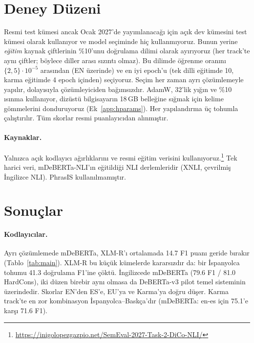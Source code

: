 \section{Deney Düzeni}
\label{sec:setup}

Resmi test kümesi ancak Ocak 2027'de yayımlanacağı için açık dev kümesini test kümesi olarak kullanıyor ve model seçiminde hiç kullanmıyoruz. Bunun yerine \emph{eğitim} kaynak çiftlerinin \%10'unu doğrulama dilimi olarak ayırıyoruz (her track'te aynı çiftler; böylece diller arası sızıntı olmaz). Bu dilimde öğrenme oranını $\{2,5\}\cdot10^{-5}$ arasından (EN üzerinde) ve en iyi epoch'u (tek dilli eğitimde 10, karma eğitimde 4 epoch içinden) seçiyoruz. Seçim her zaman ayrı çözümlemeyle yapılır, dolayısıyla çözümleyiciden bağımsızdır. AdamW, 32'lik yığın ve \%10 ısınma kullanıyor, dizüstü bilgisayarın 18\,GB belleğine sığmak için kelime gömmelerini donduruyoruz (Ek~\ref{app:hparams}). Her yapılandırma üç tohumla çalıştırılır. Tüm skorlar resmi puanlayıcıdan alınmıştır.

\paragraph{Kaynaklar.} Yalnızca açık kodlayıcı ağırlıklarını ve resmi eğitim verisini kullanıyoruz.\footnote{\url{https://inigolopezgazpio.net/SemEval-2027-Task-2-DiCo-NLI/}} Tek harici veri, mDeBERTa-NLI'ın eğitildiği NLI derlemleridir (XNLI, çevrilmiş İngilizce NLI). PhrasIS kullanılmamıştır.

\section{Sonuçlar}
\label{sec:results}



\paragraph{Kodlayıcılar.} Ayrı çözümlemede mDeBERTa, XLM-R'ı ortalamada 14.7 F1 puanı geride bırakır (Tablo~\ref{tab:main}). XLM-R bu küçük kümelerde kararsızdır da: bir İspanyolca tohumu 41.3 doğrulama F1'ine çöktü. İngilizcede mDeBERTa (79.6 F1 / 81.0 HardCons), iki düzen birebir aynı olmasa da DeBERTa-v3 pilot temel sisteminin \citep[75 / 79;][]{apaolaza2026assessing} üzerindedir. Skorlar EN'den ES'e, EU'ya ve Karma'ya doğru düşer. Karma track'te en zor kombinasyon İspanyolca--Baskça'dır (mDeBERTa: en-es için 75.1'e karşı 71.6 F1).


